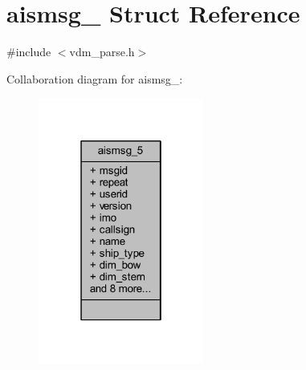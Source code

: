 \hypertarget{structaismsg__5}{}\section{aismsg\+\_ Struct Reference}
\label{structaismsg__5}


{\ttfamily \#include $<$vdm\+\_\+parse.\+h$>$}



Collaboration diagram for aismsg\+\_\+:
\nopagebreak
\begin{figure}[H]
\begin{center}
\leavevmode
\includegraphics[width=154pt]{structaismsg__5__coll__graph}
\end{center}
\end{figure}
